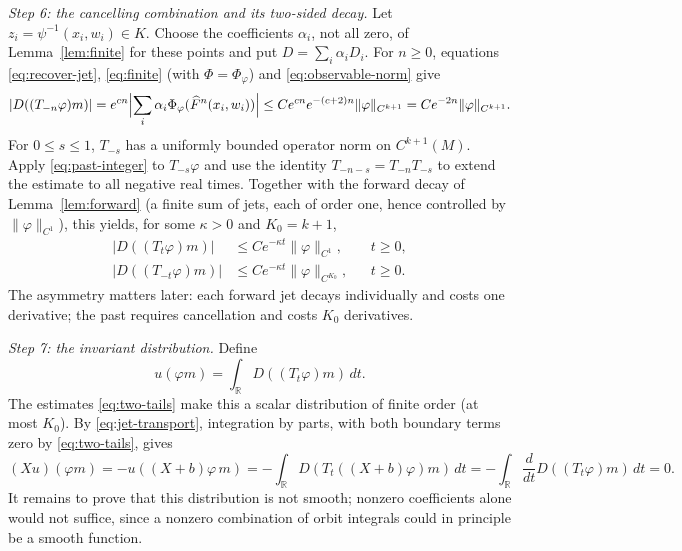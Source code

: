 \documentclass[12pt]{article}
\theoremstyle{remark}
\newcommand{\R}{\mathbb R}
\begin{document}
\emph{Step 6: the cancelling combination and its two-sided decay.}
Let \(z_i=\psi^{-1}(x_i,w_i)\in K\).
Choose the coefficients \(\alpha_i\), not all zero, of
Lemma~\ref{lem:finite} for these points and put \(D=\sum_i\alpha_iD_i\).
For \(n\ge0\), equations \eqref{eq:recover-jet}, \eqref{eq:finite}
(with \(\Phi=\Phi_\varphi\)) and \eqref{eq:observable-norm} give
\begin{equation}\label{eq:past-integer}
 |D((T_{-n}\varphi)m)|
  =e^{cn}\Bigl|\sum_i\alpha_i\Phi_\varphi(\widehat F^n(x_i,w_i))\Bigr|
  \le C e^{cn}e^{-(c+2)n}\|\varphi\|_{C^{k+1}}
  =Ce^{-2n}\|\varphi\|_{C^{k+1}}.
\end{equation}
For \(0\le s\le1\), \(T_{-s}\) has a uniformly bounded operator norm
on \(C^{k+1}(M)\).
Apply \eqref{eq:past-integer} to \(T_{-s}\varphi\) and use the
identity \(T_{-n-s}=T_{-n}T_{-s}\) to extend the estimate to all
negative real times.
Together with the forward decay of Lemma~\ref{lem:forward} (a finite
sum of jets, each of order one, hence controlled by
\(\|\varphi\|_{C^1}\)), this yields, for some \(\kappa>0\)
and \(K_0=k+1\),
\begin{equation}\label{eq:two-tails}
 \begin{aligned}
 |D((T_t\varphi)m)|&\le Ce^{-\kappa t}\|\varphi\|_{C^1},
                                      &&t\ge0,\\
 |D((T_{-t}\varphi)m)|&\le Ce^{-\kappa t}\|\varphi\|_{C^{K_0}},
                                      &&t\ge0.
 \end{aligned}
\end{equation}
The asymmetry matters later: each forward jet decays individually
and costs one derivative; the past requires cancellation and costs
\(K_0\) derivatives.

\emph{Step 7: the invariant distribution.}
Define
\begin{equation}\label{eq:invariant-u}
 u(\varphi m)=\int_{\R}D((T_t\varphi)m)\,dt.
\end{equation}
The estimates \eqref{eq:two-tails} make this a scalar distribution of
finite order (at most \(K_0\)).
By \eqref{eq:jet-transport}, integration by parts, with both boundary
terms zero by \eqref{eq:two-tails}, gives
\begin{equation}\label{eq:Xu-zero}
 (Xu)(\varphi m)
  =-u((X+b)\varphi\,m)
  =-\int_{\R}D(T_t((X+b)\varphi)m)\,dt
  =-\int_{\R}\frac{d}{dt}D((T_t\varphi)m)\,dt=0.
\end{equation}
It remains to prove that this distribution is not smooth; nonzero
coefficients alone would not suffice, since a nonzero combination of
orbit integrals could in principle be a smooth function.
\end{document}
